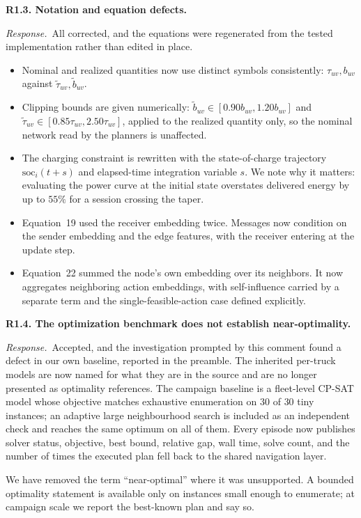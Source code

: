 \documentclass[11pt]{article}
\newcommand{\comment}[1]{\medskip\noindent\textbf{#1}\par\nopagebreak\smallskip}
\newcommand{\reply}{\noindent\textit{Response.}\ }
\begin{document}
\comment{R1.3. Notation and equation defects.}
\reply All corrected, and the equations were regenerated from the tested
implementation rather than edited in place.
\begin{itemize}[leftmargin=*,nosep]
\item Nominal and realized quantities now use distinct symbols consistently:
$\tau_{uv}, b_{uv}$ against $\tilde{\tau}_{uv}, \tilde{b}_{uv}$.
\item Clipping bounds are given numerically:
$\tilde{b}_{uv}\in[0.90 b_{uv}, 1.20 b_{uv}]$ and
$\tilde{\tau}_{uv}\in[0.85\tau_{uv}, 2.50\tau_{uv}]$, applied to the realized
quantity only, so the nominal network read by the planners is unaffected.
\item The charging constraint is rewritten with the state-of-charge trajectory
$\mathrm{soc}_i(t+s)$ and elapsed-time integration variable $s$. We note why it
matters: evaluating the power curve at the initial state overstates delivered
energy by up to $55\%$ for a session crossing the taper.
\item Equation~19 used the receiver embedding twice. Messages now condition on
the sender embedding and the edge features, with the receiver entering at the
update step.
\item Equation~22 summed the node's own embedding over its neighbors. It now
aggregates neighboring action embeddings, with self-influence carried by a
separate term and the single-feasible-action case defined explicitly.
\end{itemize}

\comment{R1.4. The optimization benchmark does not establish near-optimality.}
\reply Accepted, and the investigation prompted by this comment found a defect
in our own baseline, reported in the preamble. The inherited per-truck models
are now named for what they are in the source and are no longer presented as
optimality references. The campaign baseline is a fleet-level CP-SAT model whose
objective matches exhaustive enumeration on $30$ of $30$ tiny instances; an
adaptive large neighbourhood search is included as an independent check and
reaches the same optimum on all of them. Every episode now publishes solver
status, objective, best bound, relative gap, wall time, solve count, and the
number of times the executed plan fell back to the shared navigation layer.

We have removed the term ``near-optimal'' where it was unsupported. A bounded
optimality statement is available only on instances small enough to enumerate;
at campaign scale we report the best-known plan and say so.
\end{document}
